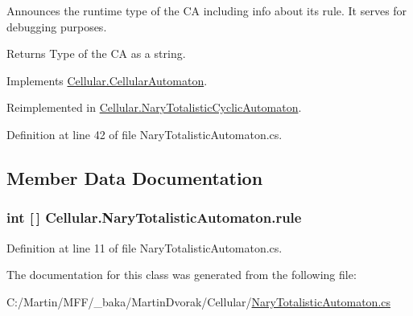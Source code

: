 Announces the runtime type of the C\+A including info about its rule. It serves for debugging purposes. 

\begin{DoxyReturn}{Returns}
Type of the C\+A as a string.
\end{DoxyReturn}


Implements \hyperlink{class_cellular_1_1_cellular_automaton_abe4b92fd405530c8a08cc07a3a19fff4}{Cellular.\+Cellular\+Automaton}.



Reimplemented in \hyperlink{class_cellular_1_1_nary_totalistic_cyclic_automaton_ac5c39cfb72386e3ab6132ab420091ae9}{Cellular.\+Nary\+Totalistic\+Cyclic\+Automaton}.



Definition at line 42 of file Nary\+Totalistic\+Automaton.\+cs.



\subsection{Member Data Documentation}
\hypertarget{class_cellular_1_1_nary_totalistic_automaton_a878c767c6823bd8ed8dc0f7d2ccb1fd2}{}
\subsubsection[{rule}]{\setlength{\rightskip}{0pt plus 5cm}int \mbox{[}$\,$\mbox{]} Cellular.\+Nary\+Totalistic\+Automaton.\+rule\hspace{0.3cm}{\ttfamily [protected]}}\label{class_cellular_1_1_nary_totalistic_automaton_a878c767c6823bd8ed8dc0f7d2ccb1fd2}


Definition at line 11 of file Nary\+Totalistic\+Automaton.\+cs.



The documentation for this class was generated from the following file\+:\begin{DoxyCompactItemize}
\item 
C\+:/\+Martin/\+M\+F\+F/\+\_\+baka/\+Martin\+Dvorak/\+Cellular/\hyperlink{_nary_totalistic_automaton_8cs}{Nary\+Totalistic\+Automaton.\+cs}\end{DoxyCompactItemize}
